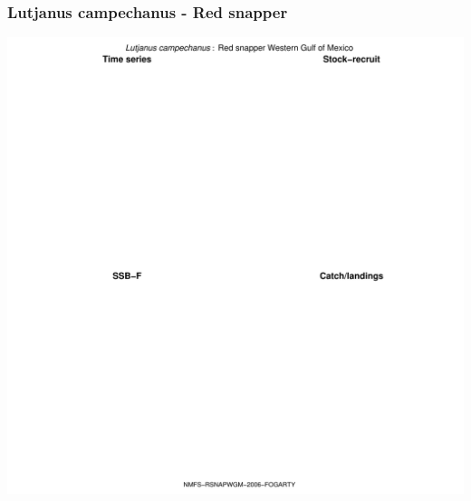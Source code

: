 \subsubsection{Lutjanus campechanus - Red snapper}
\begin{center}
\includegraphics[width=1.2\textwidth]{../R/figures/NMFS-RSNAPWGM-2006-FOGARTY.pdf}
\end{center}

